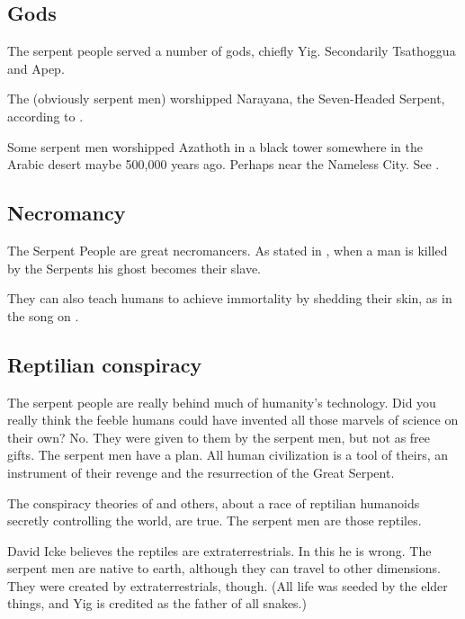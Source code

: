 \documentclass[a4paper,12pt,openany,oneside]{book}
\begin{document}
\subsection{Gods}
The serpent people served a number of gods, chiefly Yig.
Secondarily Tsathoggua and Apep.

The  (obviously serpent men) worshipped Narayana, the Seven-Headed Serpent, according to \cite[p.108]{RichardTierney:ThroneofAchamoth}. 

Some serpent men worshipped Azathoth in a black tower somewhere in the Arabic desert maybe 500,000 years ago. 
Perhaps near the Nameless City. See \cite{JohnGlasby:TheNamelessTower}.









\subsection{Necromancy}
The Serpent People are great necromancers. 
As stated in \cite{RobertEHoward:TheShadowKingdom}, when a man is killed by the Serpents his ghost becomes their slave. 

They can also teach humans to achieve immortality by shedding their skin, as in the song  on \cite{Nile:AmongsttheCatacombsofNephrenKa}.










\subsection{Reptilian conspiracy}
\label{Reptilian conspiracy}
The serpent people are really behind much of humanity's technology. 
Did you really think the feeble humans could have invented all those marvels of science on their own?
No.
They were given to them by the serpent men, but not as free gifts.
The serpent men have a plan.
All human civilization is a tool of theirs, an instrument of their revenge and the resurrection of the Great Serpent. 

The conspiracy theories of \cite{DavidIcke:TheBiggestSecret} and others, about a race of reptilian humanoids secretly controlling the world, are true.
The serpent men are those reptiles. 

David Icke believes the reptiles are extraterrestrials. 
In this he is wrong.
The serpent men are native to earth, although they can travel to other dimensions.
They were created by extraterrestrials, though. 
(All life was seeded by the elder things, and Yig is credited as the father of all snakes.)
\end{document}

